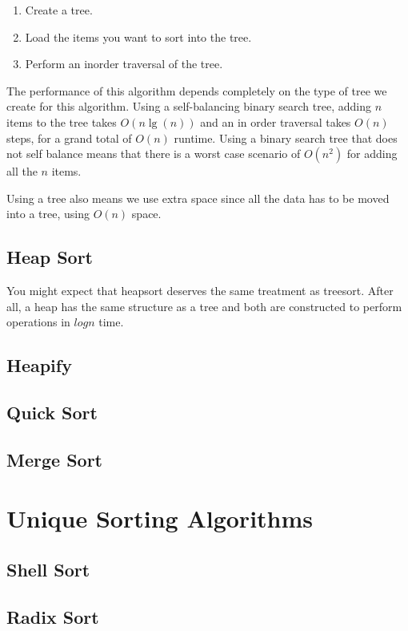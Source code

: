 \documentclass[10pt,a4paper]{book}
\begin{document}
\begin{enumerate}
	\item Create a tree.
	\item Load the items you want to sort into the tree.
	\item Perform an inorder traversal of the tree.
\end{enumerate}


The performance of this algorithm depends completely on the type of tree we create for this algorithm.  Using a self-balancing binary search tree, adding $ n $ items to the tree takes $ O(n\lg(n)) $ and an in order traversal takes $ O(n) $ steps, for a grand total of $ O(n) $ runtime.  Using a binary search tree that does not self balance means that there is a worst case scenario of $ O(n^{2}) $ for adding all the $ n $ items.

Using a tree also means we use extra space since all the data has to be moved into a tree, using $ O(n) $ space.
\subsection{Heap Sort}
You might expect that heapsort deserves the same treatment as treesort.
After all, a heap has the same structure as a tree and both are constructed to perform operations in $log n $ time.

\subsection{Heapify}

\subsection{Quick Sort}
\subsection{Merge Sort}



\section{Unique Sorting Algorithms}


\subsection{Shell Sort}

\subsection{Radix Sort}
\end{document}
